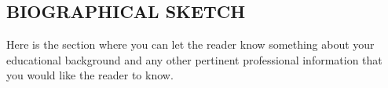 \documentclass[12 pt]{uncw_thesis}
\theoremstyle{plain}
\theoremstyle{remark}
\theoremstyle{definition}
\begin{document}
%
%


%
%
%
%
\pagestyle{main}
\newpage
{}






%
%
\newpage
\begin{singlespace}
\section*{BIOGRAPHICAL SKETCH}
Here is the section where you can let the reader know something
about your educational background and any other pertinent
professional information that you would like the reader to know.
\end{singlespace}
\end{document}
